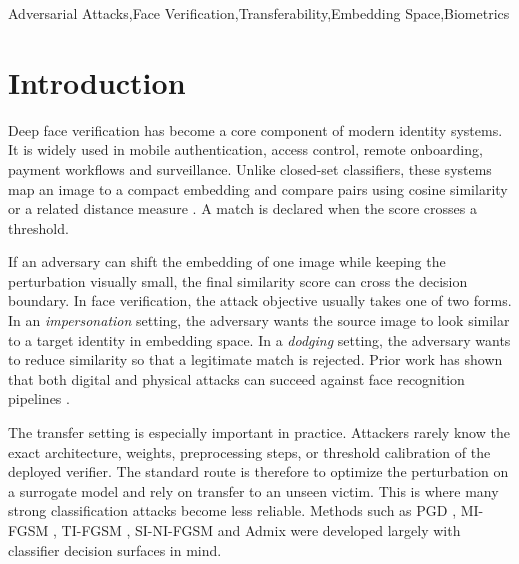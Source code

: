 \documentclass[a4paper,fleqn]{cas-dc}
\begin{document}

\begin{keywords}
 Adversarial Attacks\sep Face Verification\sep Transferability\sep Embedding Space\sep Biometrics 
\end{keywords}

\maketitle

\section{Introduction}
Deep face verification has become a core component of modern identity systems. It is widely used in mobile authentication, access control, remote onboarding, payment workflows and surveillance. Unlike closed-set classifiers, these systems map an image to a compact embedding and compare pairs using cosine similarity or a related distance measure \citet{taigman2014deepface,wang2018cosface}. A match is declared when the score crosses a threshold.

If an adversary can shift the embedding of one image while keeping the perturbation visually small, the final similarity score can cross the decision boundary. In face verification, the attack objective usually takes one of two forms. In an \emph{impersonation} setting, the adversary wants the source image to look similar to a target identity in embedding space. In a \emph{dodging} setting, the adversary wants to reduce similarity so that a legitimate match is rejected. Prior work has shown that both digital and physical attacks can succeed against face recognition pipelines \citet{sharif2016accessorize,goswami2018unravelling}.

The transfer setting is especially important in practice. Attackers rarely know the exact architecture, weights, preprocessing steps, or threshold calibration of the deployed verifier. The standard route is therefore to optimize the perturbation on a surrogate model and rely on transfer to an unseen victim. This is where many strong classification attacks become less reliable. Methods such as PGD \citet{madry2018towards}, MI-FGSM \citet{dong2018boosting}, TI-FGSM \citet{dong2019evading}, SI-NI-FGSM \citet{lin2020nesterov} and Admix \citet{wang2021admix} were developed largely with classifier decision surfaces in mind.
\end{document}
